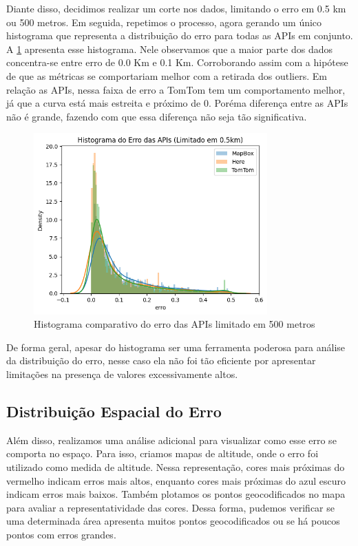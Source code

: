 Diante disso, decidimos realizar um corte nos dados, limitando o erro em 0.5 km ou 500 metros. Em seguida, repetimos o processo, agora gerando um único histograma que representa a distribuição do erro para todas as APIs em conjunto. A \ref{fig:histLimitado} apresenta esse histograma. Nele observamos que a maior parte dos dados concentra-se entre erro de 0.0 Km e 0.1 Km. Corroborando assim com a hipótese de que as métricas se comportariam melhor com a retirada dos outliers. Em relação as APIs, nessa faixa de erro a TomTom tem um comportamento melhor, já que a curva está mais estreita e próximo de 0. Poréma diferença entre as APIs não é grande, fazendo com que essa diferença não seja tão significativa. 
 
\begin{figure}[h]
  \centering
  \includegraphics[width=0.8\textwidth]{Figuras/hist5.png}
  \caption{Histograma comparativo do erro das APIs limitado em 500 metros}
  \label{fig:histLimitado}
\end{figure}

De forma geral, apesar do histograma ser uma ferramenta poderosa para análise da distribuição do erro, nesse caso ela não foi tão eficiente por apresentar limitações na presença de valores excessivamente altos. 

\subsection{Distribuição Espacial do Erro}
Além disso, realizamos uma análise adicional para visualizar como esse erro se comporta no espaço. Para isso, criamos mapas de altitude, onde o erro foi utilizado como medida de altitude. Nessa representação, cores mais próximas do vermelho indicam erros mais altos, enquanto cores mais próximas do azul escuro indicam erros mais baixos. Também plotamos os pontos geocodificados no mapa para avaliar a representatividade das cores. Dessa forma, pudemos verificar se uma determinada área apresenta muitos pontos geocodificados ou se há poucos pontos com erros grandes.

